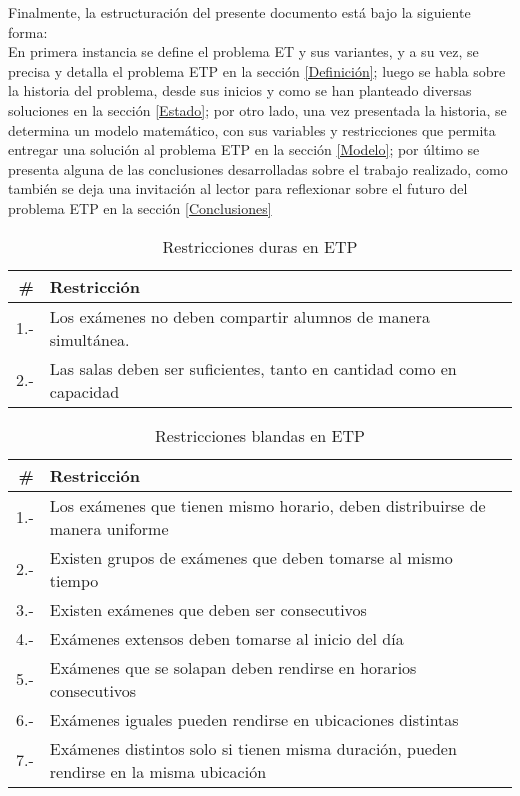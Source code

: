 Finalmente, la estructuración del presente documento está bajo la siguiente forma:\\
En primera instancia se define el problema ET y sus variantes, y a su vez, se precisa y detalla el problema ETP en la sección \ref{Definición}; luego se habla sobre la historia del problema, desde sus inicios y como se han planteado diversas soluciones en la sección \ref{Estado}; por otro lado, una vez presentada la historia, se determina un modelo matemático, con sus variables y restricciones que permita entregar una solución al problema ETP en la sección \ref{Modelo}; por último se presenta alguna de las conclusiones desarrolladas sobre el trabajo realizado, como también se deja una invitación al lector para reflexionar sobre el futuro del problema ETP en la sección \ref{Conclusiones}

\begin{table}[]
    \begin{center}
        \begin{tabular}{| r | l| }
        \hline
        \textbf{#} & \textbf{Restricción} \\ \hline \hline
        1.- & Los exámenes no deben compartir alumnos de manera simultánea.   \\ \hline
        2.- & Las salas deben ser suficientes, tanto en cantidad como en capacidad  \\ \hline
        \end{tabular}
        \caption{Restricciones duras en ETP \cite{Cita5}}
        \label{tab:Restricciones duras}
    \end{center}
\end{table}

\begin{table}[]
    \begin{center}
        \begin{tabular}{| r | l| }
        \hline
        \textbf{#} & \textbf{Restricción} \\ \hline \hline
        1.- & Los exámenes que tienen mismo horario, deben distribuirse de manera uniforme   \\ \hline
        2.- & Existen grupos de exámenes que deben tomarse al mismo tiempo  \\ \hline
        3.- & Existen exámenes que deben ser consecutivos  \\ \hline
        4.- & Exámenes extensos deben tomarse al inicio del día  \\ \hline
        5.- & Exámenes que se solapan deben rendirse en horarios consecutivos  \\ \hline
        6.- & Exámenes iguales pueden rendirse en ubicaciones distintas  \\ \hline
        7.- & Exámenes distintos solo si tienen misma duración, pueden rendirse en la misma ubicación  \\ \hline
        \end{tabular}
        \caption{Restricciones blandas en ETP \cite{Cita5}}
        \label{tab:Restricciones blandas}
    \end{center}
\end{table}


